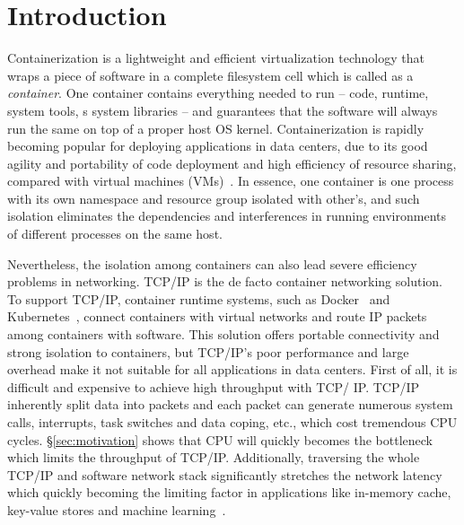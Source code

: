 \section{Introduction} \label{sec:introduction}


Containerization is a lightweight and efficient virtualization technology that 
wraps a piece of software in a complete filesystem cell which is called as a 
{\em container}. 
One container contains everything needed to run -- code, runtime, system tools, s
system libraries -- and guarantees that the software will always run the same on 
top of a proper host OS kernel. Containerization is rapidly
becoming popular for deploying applications in data centers, 
due to its good agility 
and portability of code deployment and high efficiency of resource sharing, 
compared with virtual machines (VMs)~\cite{?}. In essence, one container is
one process with its own namespace and resource group isolated with other's,
and such isolation eliminates the dependencies and interferences in running 
environments of different processes on the same host.


Nevertheless, the isolation among containers can also lead severe efficiency
problems in networking. TCP/IP is the de facto container networking solution. 
To support TCP/IP, container runtime systems, such as Docker~\cite{?} and
Kubernetes~\cite{?}, connect containers with virtual networks and route IP 
packets among containers with software. This solution offers portable 
connectivity and strong isolation to containers, but TCP/IP's poor performance
and large overhead make it not suitable for all applications in data centers.
First of all, it is difficult and expensive to achieve high throughput with TCP/
IP. TCP/IP inherently split data into packets and each packet can generate 
numerous system calls, interrupts, task switches and data coping, etc., which 
cost tremendous CPU cycles. \S\ref{sec:motivation} shows that CPU will quickly 
becomes the bottleneck which limits the throughput of TCP/IP. Additionally, 
traversing the whole TCP/IP and software network stack significantly stretches 
the network latency which quickly becoming the limiting factor in applications
like in-memory cache, key-value stores and machine learning~\cite{?}.

